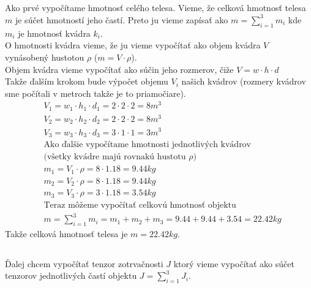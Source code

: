 \documentclass[a4paper]{article}
\begin{document}
	\subsection{}
	
	Ako prvé vypočítame hmotnosť celého telesa. Vieme, že celková hmotnosť telesa $m$ je súčet hmotností jeho častí. Preto ju vieme zapísať ako $m=\sum_{i=1}^{3}m_i$ kde $m_i$ je hmotnosť kvádra $k_i$.
	\\
	O hmotnosti kvádra vieme, že ju vieme vypočítať ako objem kvádra $V$ vynásobený hustotou $\rho$ ($m = V \cdot \rho$). 
	\\
	Objem kvádra vieme vypočítať ako súčin jeho rozmerov, čiže $V=w \cdot h \cdot d$
	\\
	Takže ďalším krokom bude výpočet objemu $V_i$ našich kvádrov (rozmery kvádrov sme počítali v metroch takže je to priamočiare). 
	\begin{align*}
		&V_1 = w_1 \cdot h_1 \cdot d_1 = 2 \cdot 2 \cdot 2 = 8 m^3 
		\\
		&V_2 = w_2 \cdot h_2 \cdot d_2 = 2 \cdot 2 \cdot 2 = 8 m^3 
		\\
		&V_3 = w_3 \cdot h_3 \cdot d_3 = 3 \cdot 1 \cdot 1 = 3 m^3
		\\
		&\text{Ako ďalšie vypočítame hmotnosti jednotlivých kvádrov}
		\\
		&\text{(všetky kvádre majú rovnakú hustotu $\rho$)} 
		\\
		&m_1 = V_1 \cdot \rho = 8 \cdot 1.18 = 9.44 kg
		\\
		&m_2 = V_2 \cdot \rho = 8 \cdot 1.18 = 9.44 kg
		\\
		&m_3 = V_3 \cdot \rho = 3 \cdot 1.18 = 3.54 kg
		\\
		&\text{Teraz môžeme vypočítať celkovú hmotnosť objektu}
		\\
		&m = \sum_{i=1}^{3} m_i = m_1 + m_2 + m_3 = 9.44 + 9.44 + 3.54 = 22.42 kg
	\end{align*}  
	Takže celková hmotnosť telesa je $m = 22.42 kg$.
	
	\subsection{}
	
	Ďalej chcem vypočítať tenzor zotrvačnosti $J$ ktorý vieme vypočítať ako súčet tenzorov jednotlivých častí objektu $J = \sum_{i=1}^{3} J_i$.
\end{document}
